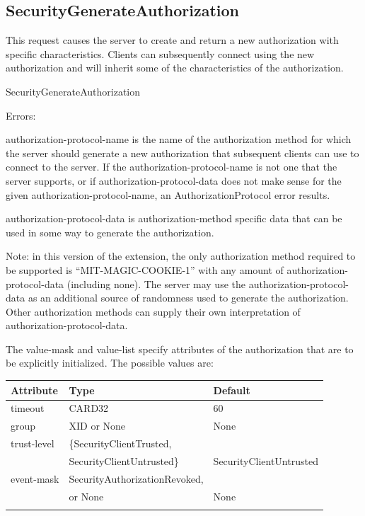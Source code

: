 \subsection{SecurityGenerateAuthorization}

This request causes the server to create and return a new
authorization with specific characteristics.  Clients can subsequently
connect using the new authorization and will inherit some of the
characteristics of the authorization.

\begin{arequest}{SecurityGenerateAuthorization}
\areply
{}
\end{arequest}

Errors: 

authorization-protocol-name is the name of the authorization method
for which the server should generate a new authorization that
subsequent clients can use to connect to the server.  If the
authorization-protocol-name is not one that the server supports, or if
authorization-protocol-data does not make sense for the given
authorization-protocol-name, an AuthorizationProtocol error results.

authorization-protocol-data is authorization-method specific data that
can be used in some way to generate the authorization.

Note: in this version of the extension, the only authorization method
required to be supported is ``MIT-MAGIC-COOKIE-1'' with any amount of
authorization-protocol-data (including none).  The server may use the
authorization-protocol-data as an additional source of randomness used
to generate the authorization.  Other authorization methods can supply
their own interpretation of authorization-protocol-data.

The value-mask and value-list specify attributes of the authorization
that are to be explicitly initialized.  The possible values are:

\begin{tabular}{lll}
\\ \hline
Attribute	& Type		& Default	\\ \hline
timeout		& CARD32	& 60		\\
group		& XID or None	& None		\\
trust-level	& \{SecurityClientTrusted, \\
		& SecurityClientUntrusted\} & SecurityClientUntrusted \\
event-mask	& SecurityAuthorizationRevoked, \\
		& or None	& None		\\ \hline
\\
\end{tabular}

